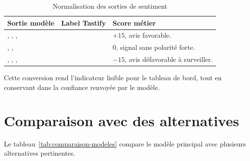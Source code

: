 \begin{table}[H]
\centering
\caption{Normalisation des sorties de sentiment}
\label{tab:normalisation-sentiment}
\begin{tabularx}{\textwidth}{p{3.2cm}p{3.4cm}Y}
\toprule
\textbf{Sortie modèle} & \textbf{Label Tastify} & \textbf{Score métier} \\
\midrule
{}, , ,  &  & $+15$, avis favorable. \\
, ,  &  & $0$, signal sans polarité forte. \\
, , ,  &  & $-15$, avis défavorable à surveiller. \\
\bottomrule
\end{tabularx}
\end{table}

Cette conversion rend l'indicateur lisible pour le tableau de bord, tout en conservant dans  la confiance renvoyée par le modèle.

\section{Comparaison avec des alternatives}
Le tableau~\ref{tab:comparaison-modeles} compare le modèle principal avec plusieurs alternatives pertinentes.

